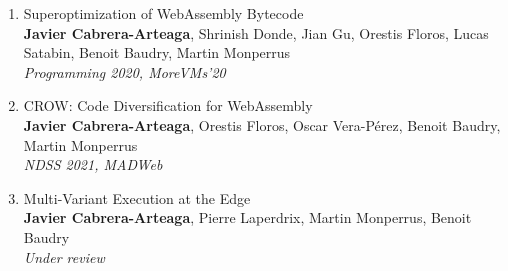 \begin{enumerate}[label=\subscript{P}{{\arabic*}}]
    \item Superoptimization of WebAssembly Bytecode \cite{WasmSuperoptimizer}\\
    {\small\textbf{Javier Cabrera-Arteaga}, Shrinish Donde, Jian Gu, Orestis Floros, Lucas Satabin, Benoit Baudry, Martin Monperrus}\\
        \emph{Programming 2020, MoreVMs'20}\\
    \item CROW: Code Diversification for WebAssembly \cite{CROW}\\
    {\small\textbf{Javier Cabrera-Arteaga}, Orestis Floros, Oscar Vera-Pérez, Benoit Baudry, Martin Monperrus}\\
    \emph{NDSS 2021, MADWeb}\\
    \item Multi-Variant Execution at the Edge \cite{MEWE}\\
    {\small\textbf{Javier Cabrera-Arteaga}, Pierre Laperdrix, Martin Monperrus, Benoit Baudry}\\
    \emph{Under review}\\

\end{enumerate}
